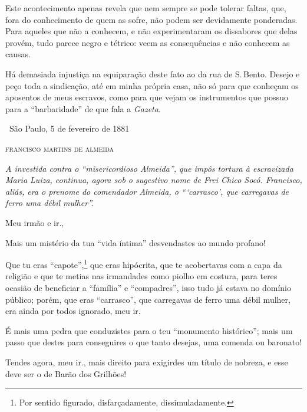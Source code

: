 Este acontecimento apenas revela que nem sempre se pode tolerar faltas,
que, fora do conhecimento de quem as sofre, não podem ser devidamente
ponderadas. Para aqueles que não a conhecem, e não experimentaram os
dissabores que delas provém, tudo parece negro e tétrico: veem as
consequências e não conhecem as causas.

Há demasiada injustiça na equiparação deste fato ao da rua de S.\,Bento.
Desejo e peço toda a sindicação, até em minha própria casa, não só para
que conheçam os aposentos de meus escravos, como para que vejam os
instrumentos que possuo para a ``barbaridade'' de que fala a
\emph{Gazeta}.

\medskip
\hfill\ São Paulo, 5 de fevereiro de 1881

\hfill\textsc{francisco martins de almeida}


\begin{resumo}
\emph{A investida contra o ``misericordioso Almeida'', que impôs tortura à
escravizada Maria Luiza, continua, agora sob o sugestivo nome de Frei
Chico Socó. Francisco, aliás, era o prenome do comendador Almeida,
o ```carrasco', que carregavas de ferro uma débil mulher''.}
\end{resumo}

Meu irmão e ir., %

Mais um mistério da tua ``vida íntima'' desvendastes ao mundo profano!

Que tu eras ``capote'',\footnote{Por sentido figurado, disfarçadamente,
  dissimuladamente.} que eras hipócrita, que te acobertavas com a capa
da religião e que te metias nas irmandades como piolho em costura, para
teres ocasião de beneficiar a ``família'' e ``compadres'', isso tudo já
estava no domínio público; porém, que eras ``carrasco'', que carregavas de
ferro uma débil mulher, era ainda por todos ignorado, meu ir.

É mais uma pedra que conduzistes para o teu ``monumento histórico''; mais
um passo que destes para conseguires o que tanto desejas, uma comenda ou
baronato!

Tendes agora, meu ir., mais direito para exigirdes um título de
nobreza, e esse deve ser o de Barão dos Grilhões!

